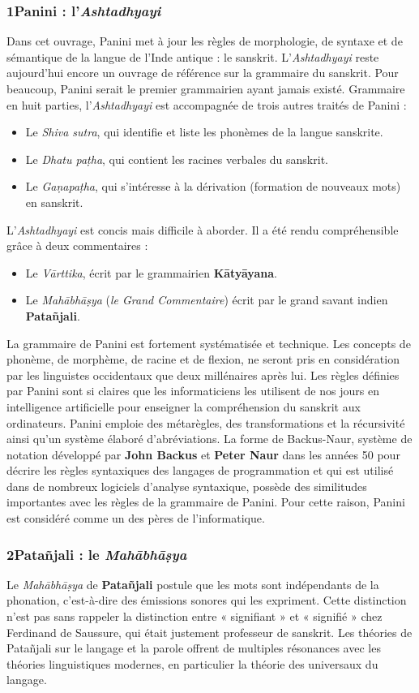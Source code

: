 \subsubsection*{1\quad Panini : l’\textit{Ashtadhyayi}}
Dans cet ouvrage, Panini met à jour les règles de morphologie, de syntaxe et de sémantique de la langue de l’Inde antique : le sanskrit. L’\textit{Ashtadhyayi} reste aujourd’hui encore un ouvrage de référence sur la grammaire du sanskrit. Pour beaucoup, Panini serait le premier grammairien ayant jamais existé. Grammaire en huit parties, l’\textit{Ashtadhyayi} est accompagnée de trois autres traités de Panini :
\begin{itemize}
\item Le \textit{Shiva sutra}, qui identifie et liste les phonèmes de la langue sanskrite.
\item Le \textit{Dhatu paṭha}, qui contient les racines verbales du sanskrit.
\item Le \textit{Gaṇapaṭha}, qui s’intéresse à la dérivation (formation de nouveaux mots) en sanskrit.
\end{itemize}
L’\textit{Ashtadhyayi} est concis mais difficile à aborder. Il a été rendu compréhensible grâce à deux commentaires :
\begin{itemize}
\item Le \textit{Vārttika}, écrit par le grammairien \textbf{Kātyāyana}.
\item Le \textit{Mahābhāṣya} (\textit{le Grand Commentaire}) écrit par le grand savant indien \textbf{Patañjali}.
\end{itemize}
La grammaire de Panini est fortement systématisée et technique. Les concepts de phonème, de morphème, de racine et de flexion, ne seront pris en considération par les linguistes occidentaux que deux millénaires après lui. Les règles définies par Panini sont si claires que les informaticiens les utilisent de nos jours en intelligence artificielle pour enseigner la compréhension du sanskrit aux ordinateurs. Panini emploie des métarègles, des transformations et la récursivité ainsi qu’un système élaboré d’abréviations. La forme de Backus-Naur, système de notation développé par \textbf{John Backus} et \textbf{Peter Naur} dans les années 50 pour décrire les règles syntaxiques des langages de programmation et qui est utilisé dans de nombreux logiciels d’analyse syntaxique, possède des similitudes importantes avec les règles de la grammaire de Panini. Pour cette raison, Panini est considéré comme un des pères de l’informatique.
\subsubsection*{2\quad Patañjali : le \textit{Mahābhāṣya}}
Le \textit{Mahābhāṣya} de \textbf{Patañjali} postule que les mots sont indépendants de la phonation, c’est-à-dire des émissions sonores qui les expriment. Cette distinction n’est pas sans rappeler la distinction entre « signifiant » et « signifié » chez Ferdinand de Saussure, qui était justement professeur de sanskrit. Les théories de Patañjali sur le langage et la parole offrent de multiples résonances avec les théories linguistiques modernes, en particulier la théorie des universaux du langage.
